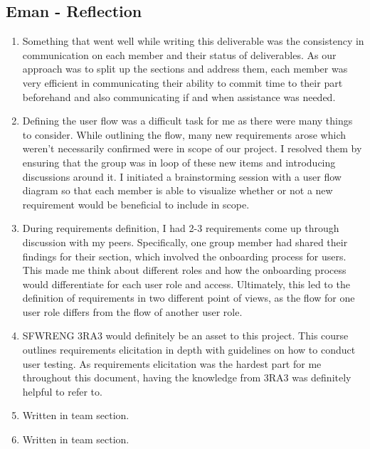 \documentclass[12pt]{article}
\begin{document}
\subsection*{Eman - Reflection}
\begin{enumerate}
  \item Something that went well while writing this deliverable was the consistency in communication on each member and their status of deliverables. As our approach was to split up the sections and address them, each member was very efficient in communicating their ability to commit time to their part beforehand and also communicating if and when assistance was needed.
  \item Defining the user flow was a difficult task for me as there were many things to consider. While outlining the flow, many new requirements arose which weren’t necessarily confirmed were in scope of our project. I resolved them by ensuring that the group was in loop of these new items and introducing discussions around it. I initiated a brainstorming session with a user flow diagram so that each member is able to visualize whether or not a new requirement would be beneficial to include in scope.
  \item During requirements definition, I had 2-3 requirements come up through discussion with my peers. Specifically, one group member had shared their findings for their section, which involved the onboarding process for users. This made me think about different roles and how the onboarding process would differentiate for each user role and access. Ultimately, this led to the definition of requirements in two different point of views, as the flow for one user role differs from the flow of another user role. 
  \item SFWRENG 3RA3 would definitely be an asset to this project. This course outlines requirements elicitation in depth with guidelines on how to conduct user testing. As requirements elicitation was the hardest part for me throughout this document, having the knowledge from 3RA3 was definitely helpful to refer to.
  \item Written in team section.
  \item Written in team section. \\
\end{enumerate}
\end{document}
